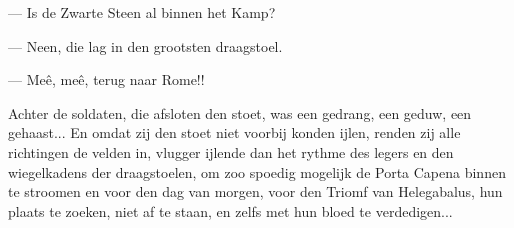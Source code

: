 \documentclass[a4paper, 12pt, oneside, dutch]{article}
\begin{document}
--- Is de Zwarte Steen al binnen het Kamp?

--- Neen, die lag in den grootsten draagstoel.

--- Meê, meê, terug naar Rome!!

Achter de soldaten, die afsloten den stoet, was een gedrang, een geduw, een gehaast... En omdat zij den stoet niet voorbij konden ijlen, renden zij alle richtingen de velden in, vlugger ijlende dan het rythme des legers en den wiegelkadens der draagstoelen, om zoo spoedig mogelijk de Porta Capena binnen te stroomen en voor den dag van morgen, voor den Triomf van Helegabalus, hun plaats te zoeken, niet af te staan, en zelfs met hun bloed te verdedigen...

\subsection{}
\end{document}
